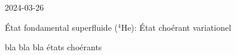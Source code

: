 


2024-03-26

État fondamental superfluide (\(^{4}\)He): État choérant variationel 

bla bla bla états choérants


